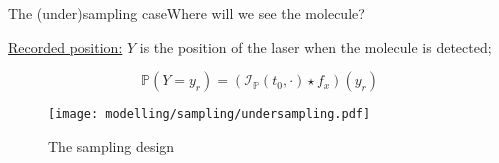 \begin{frame}{The (under)sampling case}{Where will we see the molecule?}

\underline{Recorded position:} $Y$ is the position of the laser when the molecule is detected;

\[\mathds{P}(Y = y_{r}) = (\mathcal{I}_{\mathds{P}}(t_{0}, \cdot) \star f_{x})(y_{r})\]

\begin{figure}[H]
	\label{mapping1}\caption{The sampling design}
	\centering
    \texttt{[image: modelling/sampling/undersampling.pdf]}
\end{figure}
\end{frame}